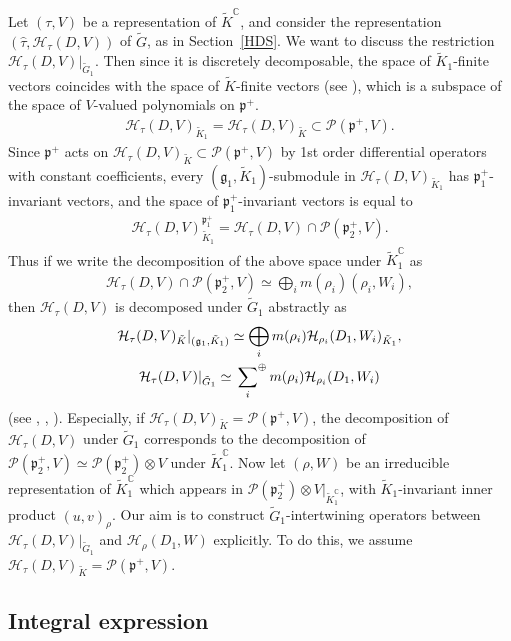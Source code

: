 \documentclass[11pt]{article}
\numberwithin{equation}{section}
\newcommand{\BC}{\mathbb{C}}
\newcommand{\fg}{\mathfrak{g}}
\newcommand{\fp}{\mathfrak{p}}
\newcommand{\cH}{\mathcal{H}}
\newcommand{\cP}{\mathcal{P}}
\newcommand{\hsum}{\sideset{}{^\oplus}{\sum}}
\begin{document}
Let $(\tau,V)$ be a representation of $\tilde{K}^\BC$, and consider the representation $(\hat{\tau},\cH_\tau(D,V))$ of $\tilde{G}$, as in Section~\ref{HDS}.
We want to discuss the restriction $\cH_\tau(D,V)|_{\tilde{G}_1}$.
Then since it is discretely decomposable, the space of $\tilde{K}_1$-finite vectors coincides with the space of $\tilde{K}$-finite vectors
(see \cite[Theorem~4.5]{K1}),
which is a subspace of the space of $V$-valued polynomials on $\fp^+$.
\begin{gather*} \cH_\tau(D,V)_{\tilde{K}_1}=\cH_\tau(D,V)_{\tilde{K}}\subset\cP(\fp^+,V). \end{gather*}
Since $\fp^+$ acts on $\cH_\tau(D,V)_{\tilde{K}}\subset\cP(\fp^+,V)$ by 1st order differential operators with constant coefficients,
every $(\fg_1,\tilde{K}_1)$-submodule in $\cH_\tau(D,V)_{\tilde{K}_1}$ has $\fp^+_1$-invariant vectors,
and the space of $\fp^+_1$-invariant vectors is equal to
\begin{gather*} \cH_\tau(D,V)_{\tilde{K}_1}^{\fp^+_1}=\cH_\tau(D,V)\cap\cP(\fp^+_2,V). \end{gather*}
Thus if we write the decomposition of the above space under $\tilde{K}_1^\BC$ as
\begin{gather*} \cH_\tau(D,V)\cap\cP(\fp^+_2,V)\simeq \bigoplus_i m(\rho_i)(\rho_i,W_i), \end{gather*}
then $\cH_\tau(D,V)$ is decomposed under $\tilde{G}_1$ abstractly as
\begin{gather*}
\cH_\tau(D,V)_{\tilde{K}}|_{(\fg_1,\tilde{K}_1)} \simeq \bigoplus_i m(\rho_i)\cH_{\rho_i}(D_1,W_i)_{\tilde{K}_1},\\
\cH_\tau(D,V)|_{\tilde{G}_1} \simeq \hsum_i m(\rho_i)\cH_{\rho_i}(D_1,W_i)
\end{gather*}
(see \cite{JV}, \cite[Section 8]{Kmf1}, \cite{Ma}). Especially, if $\cH_\tau(D,V)_{\tilde{K}}=\cP(\fp^+, V)$, the decomposition of
$\cH_\tau(D,V)$ under $\tilde{G}_1$ corresponds to the decomposition of $\cP(\fp^+_2,V)\simeq\cP(\fp^+_2)\otimes V$ under $\tilde{K}_1^\BC$.
Now let $(\rho,W)$ be an irreducible representation of $\tilde{K}_1^\BC$ which appears in $\cP(\fp^+_2)\otimes V|_{\tilde{K}_1^\BC}$,
with $\tilde{K}_1$-invariant inner product $(u,v)_\rho$.
Our aim is to construct $\tilde{G}_1$-intertwining operators between $\cH_\tau(D,V)|_{\tilde{G}_1}$ and $\cH_\rho(D_1,W)$
explicitly. To do this, we assume $\cH_\tau(D,V)_{\tilde{K}}=\cP(\fp^+,V)$.

\subsection{Integral expression}
\end{document}
